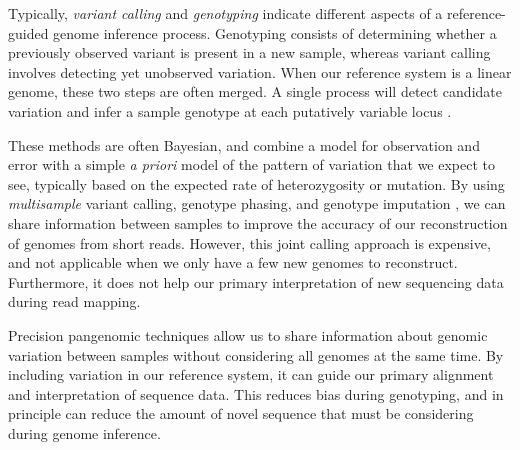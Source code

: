 Typically, \emph{variant calling} and \emph{genotyping} indicate different aspects of a reference-guided genome inference process.
Genotyping consists of determining whether a previously observed variant is present in a new sample, whereas variant calling involves detecting yet unobserved variation.
When our reference system is a linear genome, these two steps are often merged.
A single process will detect candidate variation and infer a sample genotype at each putatively variable locus \cite{Li_2011,Garrison_2012}.

These methods are often Bayesian, and combine a model for observation and error with a simple \emph{a priori} model of the pattern of variation that we expect to see, typically based on the expected rate of heterozygosity or mutation. %
By using \emph{multisample} variant calling, genotype phasing, and genotype imputation \cite{1000_2015,browning2011haplotype}, we can share information between samples to improve the accuracy of our reconstruction of genomes from short reads.
However, this joint calling approach is expensive, and not applicable when we only have a few new genomes to reconstruct.
Furthermore, it does not help our primary interpretation of new sequencing data during read mapping.

Precision pangenomic techniques allow us to share information about genomic variation between samples without considering all genomes at the same time.
By including variation in our reference system, it can guide our primary alignment and interpretation of sequence data.
This reduces bias during genotyping, and in principle can reduce the amount of novel sequence that must be considering during genome inference.

